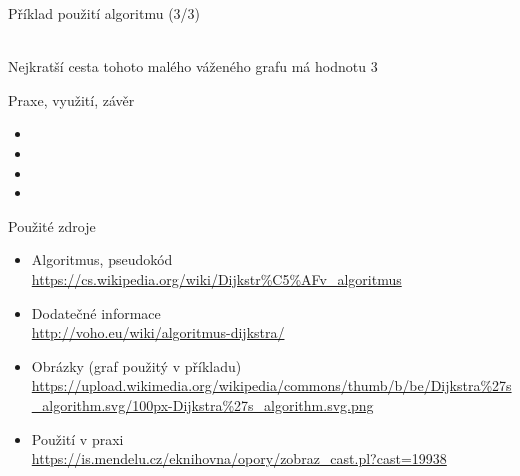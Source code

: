 \documentclass{beamer}
\begin{document}
\begin{frame}{Příklad použití algoritmu (3/3)}
    \begin{center}
    \\[1em]
    Nejkratší cesta tohoto malého váženého grafu má hodnotu 3
    \end{center}
\end{frame}

\begin{frame}{Praxe, využití, závěr}
\begin{itemize}
    \item {}
    \item {}
    \item {}
    \item {}
\end{itemize}
\end{frame}

\begin{frame}{Použité zdroje}
\begin{itemize}
\setlength{\parskip}{0.3em}
    \item Algoritmus, pseudokód \\[0.2em]
    \small{\url{https://cs.wikipedia.org/wiki/Dijkstr\%C5\%AFv\_algoritmus}}
    \item Dodatečné informace \\[0.2em]
    \small{\url{http://voho.eu/wiki/algoritmus-dijkstra/}}
    \item Obrázky (graf použitý v příkladu) \\[0.2em]
    \small{\url{https://upload.wikimedia.org/wikipedia/commons/thumb/b/be/Dijkstra\%27s\_algorithm.svg/100px-Dijkstra\%27s\_algorithm.svg.png}}
    \item Použití v praxi \\[0.2em]
    \small{\url{https://is.mendelu.cz/eknihovna/opory/zobraz_cast.pl?cast=19938}}
\end{itemize}
\end{frame}

\end{document}
